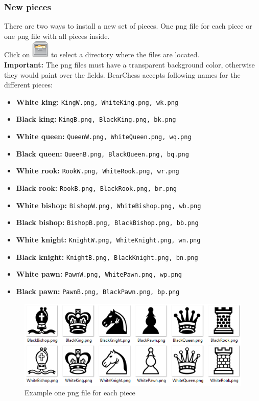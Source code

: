 \documentclass[11pt,a4paper]{article}
\begin{document}
\subsubsection{New pieces}
There are two ways to install a new set of pieces. One png file for each piece or one png file with all pieces inside. \\
Click on \includegraphics[scale=0.5]{file_manager.png} to select a directory where the files are located.\\ \textbf{Important:} The png files must have a transparent background color, otherwise they would paint over the fields.
BearChess accepts following names for the different pieces:
\begin{itemize}
	\item \textbf{White king:} \verb|KingW.png, WhiteKing.png, wk.png|
	\item \textbf{Black king:} \verb|KingB.png, BlackKing.png, bk.png|
	\item \textbf{White queen:} \verb|QueenW.png, WhiteQueen.png, wq.png|
	\item \textbf{Black queen:} \verb|QueenB.png, BlackQueen.png, bq.png|
	\item \textbf{White rook:} \verb|RookW.png, WhiteRook.png, wr.png|
	\item \textbf{Black rook:} \verb|RookB.png, BlackRook.png, br.png|
	\item \textbf{White bishop:} \verb|BishopW.png, WhiteBishop.png, wb.png|
	\item \textbf{Black bishop:} \verb|BishopB.png, BlackBishop.png, bb.png|
	\item \textbf{White knight:} \verb|KnightW.png, WhiteKnight.png, wn.png|
	\item \textbf{Black knight:} \verb|KnightB.png, BlackKnight.png, bn.png|
	\item \textbf{White pawn:} \verb|PawnW.png, WhitePawn.png, wp.png|
	\item \textbf{Black pawn:} \verb|PawnB.png, BlackPawn.png, bp.png|
\end{itemize}


\begin{figure}[H]
	\centering
	\includegraphics[scale=0.7]{Pieces.png}
	\caption{Example one png file for each piece}
	\label{fig:Pieces}
\end{figure}
\end{document}
